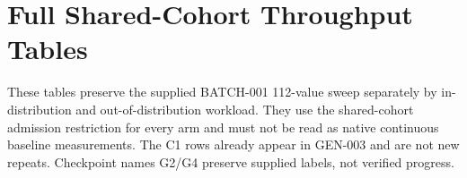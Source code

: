 \section{Full Shared-Cohort Throughput Tables}
These tables preserve the supplied BATCH-001 112-value sweep separately by
in-distribution and out-of-distribution workload. They use the shared-cohort
admission restriction for every arm and must not be read as native continuous
baseline measurements. The C1 rows already appear in GEN-003 and are not new
repeats. Checkpoint names G2/G4 preserve supplied labels, not verified progress.


